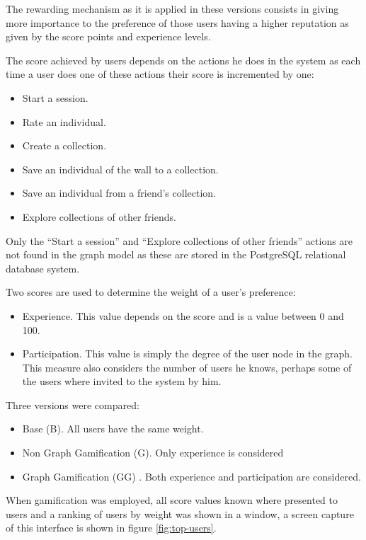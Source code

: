 \documentclass[conference]{IEEEtran}
\begin{document}
The rewarding mechanism as it is applied in these versions 
consists in giving more importance to the preference of those users having a higher reputation
as given by the score points and experience levels.  

The score achieved by users depends on the actions he does in the system as
each time a user does one of these actions their score is incremented by one:
\begin{itemize}
\item Start a session.
\item Rate an individual.
\item Create a collection.
\item Save an individual of the wall to a collection.
\item Save an individual from a friend's collection.
\item Explore collections of other friends.
\end{itemize}

Only the ``Start a session'' and ``Explore collections of other friends'' actions 
are not found in the graph model as these are stored in the PostgreSQL relational
database system. 

Two scores are used to determine the weight of a user's preference:
\begin{itemize}
\item Experience. This value depends on the score and is a value 
between 0 and 100. 

\item Participation. This value is simply the degree of the user node 
in the graph. This measure also considers the number of users he knows,
perhaps some of the users where invited to the system by him.   
\end{itemize}

Three versions were compared:
\begin{itemize}
\item Base (B). All users have the same weight.
\item Non Graph Gamification (G). Only experience is considered
\item Graph Gamification (GG) . Both experience and participation are considered.
\end{itemize}
When gamification was employed, all score values known where presented to users
and a ranking of users by weight was shown in a window, a screen capture of
this interface is shown in figure \ref{fig:top-users}. 
\end{document}

